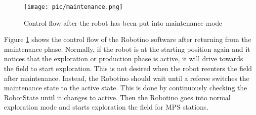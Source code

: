 \begin{figure}[h]
\centering
\texttt{[image: pic/maintenance.png]}
\caption{Control flow after the robot has been put into maintenance mode}
\label{fig:maintenance}
\end{figure}


Figure \ref{fig:maintenance} shows the control flow of the Robotino software after returning from the maintenance phase. Normally, if the robot is at the starting position again and it notices that the exploration or production phase is active, it will drive towards the field to start exploration. This is not desired when the robot reenters the field after maintenance. Instead, the Robotino should wait until a referee switches the maintenance state to the active state. This is done by continuously checking the RobotState until it changes to active. Then the Robotino goes into normal exploration mode and starts exploration the field for MPS stations. \\

\newpage

